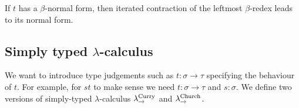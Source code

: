 \begin{boxthm}
    If $t$ has a $\beta$-normal form, then iterated contraction of the leftmost $\beta$-redex leads to its normal form.
\end{boxthm}

\subsection{Simply typed \texorpdfstring{$\lambda$}{lambda}-calculus}

We want to introduce type judgements such as $t : \sigma \to \tau$ specifying the behaviour of $t$.
For example, for $st$ to make sense we need $t : \sigma \to \tau$ and $s : \sigma$.
We define two versions of simply-typed $\lambda$-calculus $\lambda_{\to}^{\text{Curry}}$ and $\lambda_{\to}^{\text{Church}}$.

